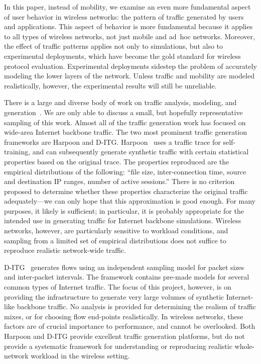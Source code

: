 \documentclass[conference]{IEEEtran}
\newcommand{\caps}[1]{{\small{#1}}}
\begin{document}
In this paper, instead of mobility, we examine an even more fundamental aspect of user behavior in wireless networks: the pattern of traffic generated by users and applications. This aspect of behavior is more fundamental because it applies to all types of wireless networks, not just mobile and ad~hoc networks. Moreover, the effect of traffic patterns applies not only to simulations, but also to experimental deployments, which have become the gold standard for wireless protocol evaluation.  Experimental deployments sidestep the problem of accurately modeling the lower layers of the network. Unless traffic and mobility are modeled realistically, however, the experimental results will still be unreliable.

There is a large and diverse body of work on traffic analysis, modeling, and generation~\cite{Paxson95,Paxson96,Sommers04,Avallone04,Hernandez06}. We are only able to discuss a small, but hopefully representative sampling of this work. Almost all of the traffic generation work has focused on wide-area Internet backbone traffic.
The two most prominent traffic generation frameworks are Harpoon and \caps{D-ITG}. Harpoon~\cite{Sommers04} uses a traffic trace for self-training, and can subsequently generate synthetic traffic with certain statistical properties based on the original trace. The properties reproduced are the empirical distributions of the following: ``file size, inter-connection time, source and destination IP ranges, number of active sessions.'' There is no criterion proposed to determine whether these properties characterize the original traffic adequately---we can only hope that this approximation is good enough. For many purposes, it likely is sufficient; in particular, it is probably appropriate for the intended use in generating traffic for Internet backbone simulations. Wireless networks, however, are particularly sensitive to workload conditions, and sampling from a limited set of empirical distributions does not suffice to reproduce realistic network-wide traffic.

\caps{D-ITG}~\cite{Avallone04} generates flows using an independent sampling model for packet sizes and inter-packet intervals. The framework contains pre-made models for several common types of Internet traffic. The focus of this project, however, is on providing the infrastructure to generate very large volumes of synthetic Internet-like backbone traffic. No analysis is provided for determining the realism of traffic mixes, or for choosing flow end-points realistically. In wireless networks, these factors are of crucial importance to performance, and cannot be overlooked. Both Harpoon and \caps{D-ITG} provide excellent traffic generation platforms, but do not provide a systematic framework for understanding or reproducing realistic whole-network workload in the wireless setting.
\end{document}
